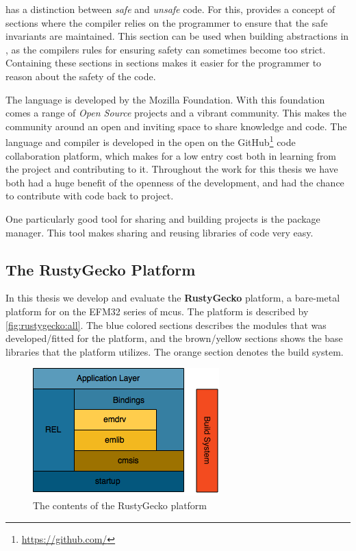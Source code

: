 {\rust} has a distinction between \emph{safe} and \emph{unsafe} code.
For this, {\rust} provides a concept of {\unsafe} sections where the compiler relies on the programmer to ensure that the safe invariants are maintained.
This section can be used when building abstractions in {\rust}, as the compilers rules for ensuring safety can sometimes become too strict.
Containing these sections in {\unsafe} sections makes it easier for the programmer to reason about the safety of the code.

The {\rust} language is developed by the Mozilla Foundation.
With this foundation comes a range of \emph{Open Source} projects and a vibrant community.
This makes the community around {\rust} an open and inviting space to share knowledge and code.
The {\rust} language and compiler is developed in the open on the GitHub\footnote{\url{https://github.com/}} code collaboration platform, which makes for a low entry cost both in learning from the project and contributing to it.
Throughout the work for this thesis we have both had a huge benefit of the openness of the development, and had the chance to contribute with code back to project.

One particularly good tool for sharing and building {\rust} projects is the {\cargo} package manager.
This tool makes sharing and reusing libraries of code very easy.

\subsection{The RustyGecko Platform}

In this thesis we develop and evaluate the \textbf{RustyGecko} platform, a bare-metal platform for {\rust} on the EFM32 series of \glspl{mcu}.
The platform is described by \autoref{fig:rustygecko:all}.
The blue colored sections describes the {\rust} modules that was developed/fitted for the platform, and the brown/yellow sections shows the base {\C} libraries that the platform utilizes.
The orange section denotes the build system.

\begin{figure}[H]
  \begin{center}
    \includegraphics{figures/RustyGecko-all.png}
  \end{center}
  \caption{The contents of the RustyGecko platform}
  \label{fig:rustygecko:all}
\end{figure}

